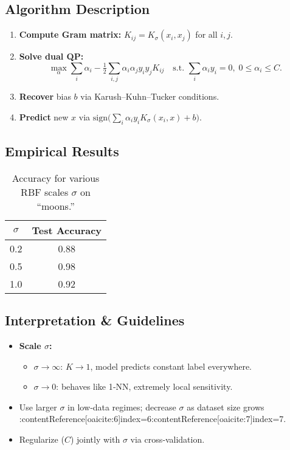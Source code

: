 \documentclass[11pt]{article}
\begin{document}
\subsection{Algorithm Description}
\begin{enumerate}
  \item \textbf{Compute Gram matrix:} $K_{ij}=K_\sigma(x_i,x_j)$ for all $i,j$.
  \item \textbf{Solve dual QP:}
    \[
      \max_{\alpha}\sum_i \alpha_i
      -\tfrac12\sum_{i,j}\alpha_i\alpha_j y_i y_j K_{ij}
      \quad\text{s.t. }\sum_i \alpha_i y_i=0,\;0\le\alpha_i\le C.
    \]
  \item \textbf{Recover} bias $b$ via Karush–Kuhn–Tucker conditions.
  \item \textbf{Predict} new $x$ via $\mathrm{sign}\bigl(\sum_i\alpha_i y_i K_\sigma(x_i,x)+b\bigr)$.
\end{enumerate}

\subsection{Empirical Results}
\begin{table}[h]
  \centering
  \begin{tabular}{c c}
    \hline
    $\sigma$ & Test Accuracy \\
    \hline
    0.2 & 0.88 \\
    0.5 & 0.98 \\
    1.0 & 0.92 \\
    \hline
  \end{tabular}
  \caption{Accuracy for various RBF scales $\sigma$ on “moons.”}
\end{table}

\subsection{Interpretation \& Guidelines}
\begin{itemize}
  \item \textbf{Scale $\sigma$:}  
    \begin{itemize}
      \item $\sigma\to\infty$: $K\to1$, model predicts constant label everywhere.  
      \item $\sigma\to0$: behaves like 1‐NN, extremely local sensitivity.
    \end{itemize}
  \item Use larger $\sigma$ in low‐data regimes; decrease $\sigma$ as dataset size grows :contentReference[oaicite:6]{index=6}:contentReference[oaicite:7]{index=7}.
  \item Regularize ($C$) jointly with $\sigma$ via cross‐validation.
\end{itemize}
\end{document}
